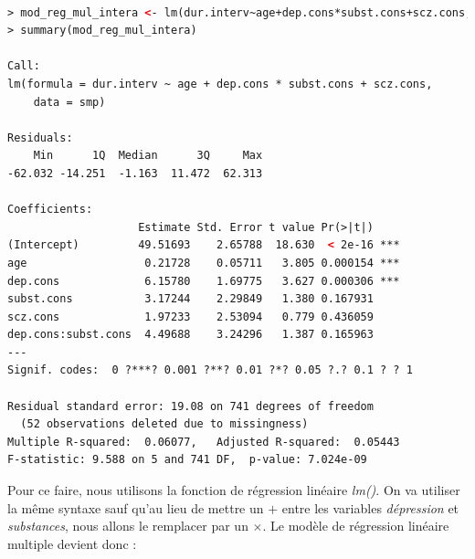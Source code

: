 \begin{lstlisting}[language=html]

> mod_reg_mul_intera <- lm(dur.interv~age+dep.cons*subst.cons+scz.cons,data = smp)
> summary(mod_reg_mul_intera)

Call:
lm(formula = dur.interv ~ age + dep.cons * subst.cons + scz.cons, 
    data = smp)

Residuals:
    Min      1Q  Median      3Q     Max 
-62.032 -14.251  -1.163  11.472  62.313 

Coefficients:
                    Estimate Std. Error t value Pr(>|t|)    
(Intercept)         49.51693    2.65788  18.630  < 2e-16 ***
age                  0.21728    0.05711   3.805 0.000154 ***
dep.cons             6.15780    1.69775   3.627 0.000306 ***
subst.cons           3.17244    2.29849   1.380 0.167931    
scz.cons             1.97233    2.53094   0.779 0.436059    
dep.cons:subst.cons  4.49688    3.24296   1.387 0.165963    
---
Signif. codes:  0 ?***? 0.001 ?**? 0.01 ?*? 0.05 ?.? 0.1 ? ? 1

Residual standard error: 19.08 on 741 degrees of freedom
  (52 observations deleted due to missingness)
Multiple R-squared:  0.06077,	Adjusted R-squared:  0.05443 
F-statistic: 9.588 on 5 and 741 DF,  p-value: 7.024e-09
\end{lstlisting}

Pour ce faire, nous utilisons la fonction de régression linéaire \textit{lm()}.
On va utiliser la même syntaxe sauf qu'au lieu de mettre un $+$ entre les variables \textit{dépression} et \textit{substances}, nous allons le remplacer par un $\times$. Le modèle de régression linéaire multiple devient donc : 


